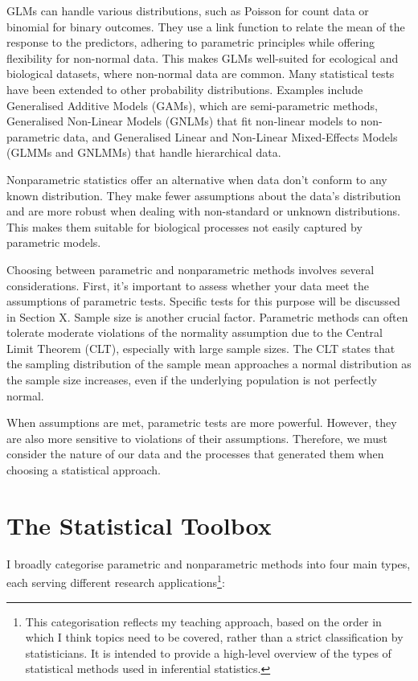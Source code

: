 \documentclass[
  letterpaper,
]{book}
\begin{document}
GLMs can handle various distributions, such as Poisson for count data or
binomial for binary outcomes. They use a link function to relate the
mean of the response to the predictors, adhering to parametric
principles while offering flexibility for non-normal data. This makes
GLMs well-suited for ecological and biological datasets, where
non-normal data are common. Many statistical tests have been extended to
other probability distributions. Examples include Generalised Additive
Models (GAMs), which are semi-parametric methods, Generalised Non-Linear
Models (GNLMs) that fit non-linear models to non-parametric data, and
Generalised Linear and Non-Linear Mixed-Effects Models (GLMMs and
GNLMMs) that handle hierarchical data.

Nonparametric statistics offer an alternative when data don't conform to
any known distribution. They make fewer assumptions about the data's
distribution and are more robust when dealing with non-standard or
unknown distributions. This makes them suitable for biological processes
not easily captured by parametric models.

Choosing between parametric and nonparametric methods involves several
considerations. First, it's important to assess whether your data meet
the assumptions of parametric tests. Specific tests for this purpose
will be discussed in Section X. Sample size is another crucial factor.
Parametric methods can often tolerate moderate violations of the
normality assumption due to the Central Limit Theorem (CLT), especially
with large sample sizes. The CLT states that the sampling distribution
of the sample mean approaches a normal distribution as the sample size
increases, even if the underlying population is not perfectly normal.

When assumptions are met, parametric tests are more powerful. However,
they are also more sensitive to violations of their assumptions.
Therefore, we must consider the nature of our data and the processes
that generated them when choosing a statistical approach.

\section{The Statistical Toolbox}\label{the-statistical-toolbox}

I broadly categorise parametric and nonparametric methods into four main
types, each serving different research applications\footnote{This
  categorisation reflects my teaching approach, based on the order in
  which I think topics need to be covered, rather than a strict
  classification by statisticians. It is intended to provide a
  high-level overview of the types of statistical methods used in
  inferential statistics.}:
\end{document}
